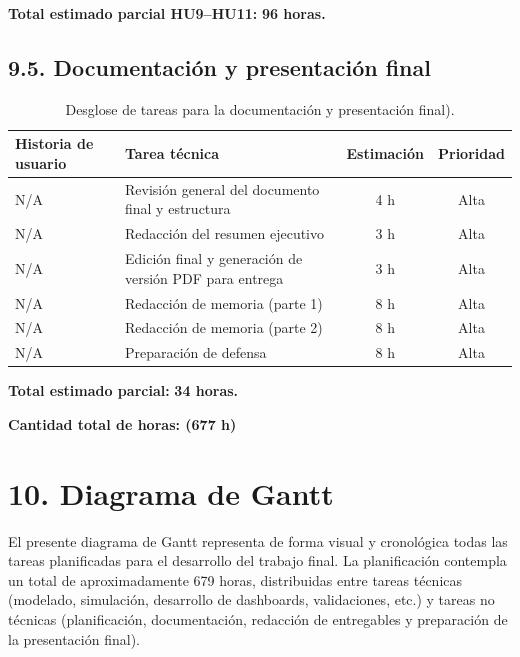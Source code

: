 \documentclass[
11pt, %
]{charter}
\begin{document}
\vspace{0.5cm}
\noindent
\textbf{Total estimado parcial HU9–HU11:} \textbf{96 horas.}

\subsection*{9.5. Documentación y presentación final}

\begin{table}[H]
\centering
\begin{tabular}{|l|p{6cm}|c|c|}
\hline
\textbf{Historia de usuario} & \textbf{Tarea técnica} & \textbf{Estimación} & \textbf{Prioridad} \\
\hline
N/A & Revisión general del documento final y estructura & 4 h & Alta \\
N/A & Redacción del resumen ejecutivo & 3 h & Alta \\
N/A & Edición final y generación de versión PDF para entrega & 3 h & Alta \\
N/A & Redacción de memoria (parte 1) & 8 h & Alta \\
N/A & Redacción de memoria (parte 2) & 8 h & Alta \\
N/A & Preparación de defensa & 8 h & Alta \\
\hline
\end{tabular}
\caption{Desglose de tareas para la documentación y presentación final).}
\end{table}

\vspace{0.5cm}
\noindent
\textbf{Total estimado parcial:} \textbf{34 horas.}

\vspace{0.2cm}
\noindent\dotfill

\vspace{0.5cm}
\noindent
\textbf{Cantidad total de horas: (677 h)}

\vspace{0.2cm}
\noindent\dotfill

\section{10. Diagrama de Gantt}
\label{sec:gantt}

El presente diagrama de Gantt representa de forma visual y cronológica todas las tareas planificadas para el desarrollo del trabajo final. La planificación contempla un total de aproximadamente 679 horas, distribuidas entre tareas técnicas (modelado, simulación, desarrollo de dashboards, validaciones, etc.) y tareas no técnicas (planificación, documentación, redacción de entregables y preparación de la presentación final).
\end{document}
